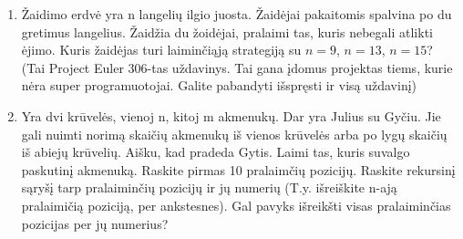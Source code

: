 \begin{enumerate}
 \item Žaidimo erdvė yra n langelių ilgio juosta. Žaidėjai pakaitomis spalvina po du gretimus langelius. Žaidžia du žoidėjai, pralaimi tas, kuris nebegali atlikti ėjimo. Kuris žaidėjas turi laiminčiąją strategiją su $n=9$, $n=13$, $n=15$? (Tai Project Euler 306-tas uždavinys. Tai gana įdomus projektas tiems, kurie nėra super programuotojai. Galite pabandyti išspręsti ir visą uždavinį)

\item Yra dvi krūvelės, vienoj n, kitoj m akmenukų. Dar yra Julius su Gyčiu. Jie gali nuimti norimą skaičių akmenukų iš vienos krūvelės arba po lygų skaičių iš abiejų krūvelių. Aišku, kad pradeda Gytis. Laimi tas, kuris suvalgo paskutinį akmenuką. Raskite pirmas 10 pralaimčių pozicijų. Raskite rekursinį sąryšį tarp pralaiminčių pozicijų ir jų numerių (T.y. išreiškite n-ają pralaimičią poziciją, per ankstesnes). Gal pavyks išreikšti visas pralaiminčias pozicijas per jų numerius?









\end{enumerate}
